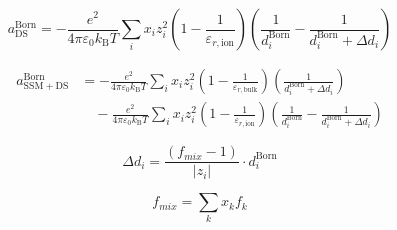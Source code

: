 \documentclass[12pt, letterpaper]{article}
\begin{document}
\begin{equation}
    a_{\mathrm{DS}}^{\mathrm{Born}}=-\frac{e^{2}}{4\pi\varepsilon_{0}k_{\mathrm{B}}T}\sum_{i}x_{i}z_{i}^{2} \left(1-\frac{1}{\varepsilon_{r,\mathrm{ion}}}\right)\left(\frac{1}{d_{i}^{\mathrm{Born}}}-\frac{1}{d_{i}^{\mathrm{Born}}+\Delta d_{i}}\right)
    \label{eq:ares_born_ds}
\end{equation}


\begin{equation}
    \begin{aligned}
        a_{\mathrm{SSM+DS}}^{\mathrm{Born}}
        &=-\frac{e^{2}}{4\pi\varepsilon_{0}k_{\mathrm{B}}T}
        \sum_{i}x_{i}z_{i}^{2}
        \left(1-\frac{1}{\varepsilon_{r,\mathrm{bulk}}}\right)
        \left(\frac{1}{d_{i}^{\mathrm{Born}}+\Delta d_{i}}\right)
        \\
        &\quad -\frac{e^{2}}{4\pi\varepsilon_{0}k_{\mathrm{B}}T}
        \sum_{i}x_{i}z_{i}^{2}
        \left(1-\frac{1}{\varepsilon_{r,\mathrm{ion}}}\right)
        \left(\frac{1}{d_{i}^{\mathrm{Born}}}-\frac{1}{d_{i}^{\mathrm{Born}}+\Delta d_{i}}\right)
    \end{aligned}
    \label{eq:ares_born_ssmds_v3}
\end{equation}



\begin{equation}
    \Delta d_{i}=\frac{(f_{mix}-1)}{|z_{i}|}\cdot d_{i}^{\mathrm{Born}}
    \label{eq:delta_d_born}
\end{equation}


\begin{equation}
    f_{mix}=\sum_{k}x_{k}f_{k}
    \label{eq:f_mix}
\end{equation}
\end{document}
